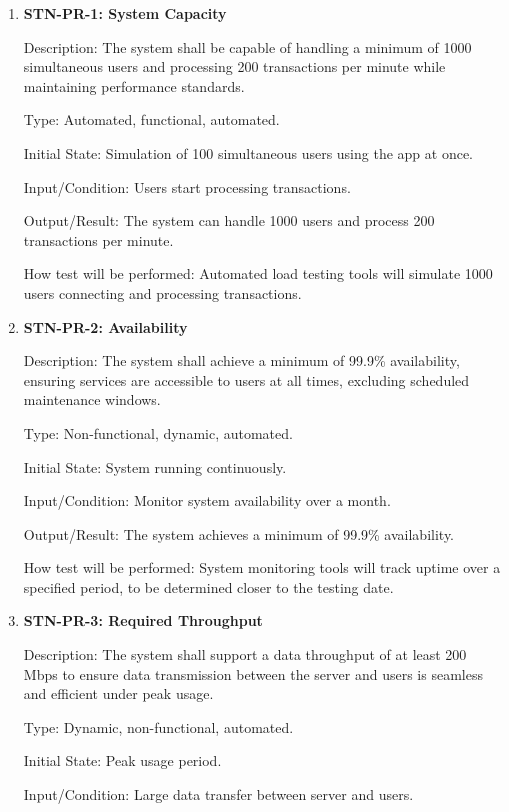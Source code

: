 \documentclass[12pt, titlepage]{article}
\begin{document}
    \begin{enumerate}
        \item {\textbf{STN-PR-1: System Capacity}}

        Description: The system shall be capable of handling a minimum of 1000 simultaneous users and processing 200 transactions per minute while maintaining performance standards.

        Type: Automated, functional, automated.

        Initial State: Simulation of 100 simultaneous users using the app at once.

        Input/Condition: Users start processing transactions.

        Output/Result: The system can handle 1000 users and process 200 transactions per minute.

        How test will be performed: Automated load testing tools will simulate 1000 users connecting and processing transactions.


        \item{\textbf{STN-PR-2: Availability}}

        Description: The system shall achieve a minimum of 99.9\% availability, ensuring services are accessible to users at all times, excluding scheduled maintenance windows.

        Type: Non-functional, dynamic, automated.

        Initial State: System running continuously.

        Input/Condition: Monitor system availability over a month.

        Output/Result: The system achieves a minimum of 99.9\% availability.

        How test will be performed: System monitoring tools will track uptime over a specified period, to be determined closer to the testing date.

        \item{\textbf{STN-PR-3: Required Throughput}}

        Description: The system shall support a data throughput of at least 200 Mbps to ensure data transmission between the server and users is seamless and efficient under peak usage.

        Type: Dynamic, non-functional, automated.

        Initial State: Peak usage period.

        Input/Condition: Large data transfer between server and users.


\end{enumerate}
\end{document}
